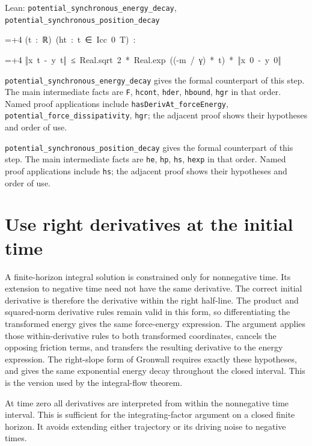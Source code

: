 \documentclass[11pt,a4paper]{article}
\newlength{\leancharwidth}
\newenvironment{leancode}{\par\smallskip\begingroup\ttfamily\footnotesize\raggedright
  \settowidth{\leancharwidth}{M}\setlength{\parskip}{0pt}\setlength{\parindent}{0pt}
  \frenchspacing}{\par\endgroup\smallskip}
\newcommand{\leanline}[2]{\hangindent=\dimexpr#1\leancharwidth+4\leancharwidth\relax
  \hangafter=1\noindent\hspace*{#1\leancharwidth}#2\par}
\newcommand{\leanlabel}[1]{\par\smallskip\noindent{\small\bfseries #1}\par}
\begin{document}
\begin{leanbox}{Lean: \texttt{potential\_\allowbreak{}synchronous\_\allowbreak{}energy\_\allowbreak{}decay}, \texttt{potential\_\allowbreak{}synchronous\_\allowbreak{}position\_\allowbreak{}decay}}
\begin{leancode}
\leanline{4}{(t\ :\ ℝ)\ (ht\ :\ t\ ∈\ Icc\ 0\ T)\ :}
\leanline{4}{‖x\ t\ -\ y\ t‖\ ≤\ Real.sqrt\ 2\ *\ Real.exp\ ((-m\ /\ γ)\ *\ t)\ *\ ‖x\ 0\ -\ y\ 0‖}
\end{leancode}
\leanlabel{How the Lean proof follows the argument}
\texttt{potential\_\allowbreak{}synchronous\_\allowbreak{}energy\_\allowbreak{}decay} gives the formal counterpart of this step. The main intermediate facts are \texttt{F}, \texttt{hcont}, \texttt{hder}, \texttt{hbound}, \texttt{hgr} in that order. Named proof applications include \texttt{has\allowbreak{}Deriv\allowbreak{}At\_\allowbreak{}force\allowbreak{}Energy}, \texttt{potential\_\allowbreak{}force\_\allowbreak{}dissipativity}, \texttt{hgr}; the adjacent proof shows their hypotheses and order of use.




\texttt{potential\_\allowbreak{}synchronous\_\allowbreak{}position\_\allowbreak{}decay} gives the formal counterpart of this step. The main intermediate facts are \texttt{he}, \texttt{hp}, \texttt{hs}, \texttt{hexp} in that order. Named proof applications include \texttt{hs}; the adjacent proof shows their hypotheses and order of use.
\end{leanbox}

\section{\texorpdfstring{Use right derivatives at the initial time}{Use right derivatives at the initial time}}


A finite-horizon integral solution is constrained only for nonnegative time. Its extension to negative time need not have the same derivative. The correct initial derivative is therefore the derivative within the right half-line. The product and squared-norm derivative rules remain valid in this form, so differentiating the transformed energy gives the same force-energy expression. The argument applies those within-derivative rules to both transformed coordinates, cancels the opposing friction terms, and transfers the resulting derivative to the energy expression. The right-slope form of Gronwall requires exactly these hypotheses, and gives the same exponential energy decay throughout the closed interval. This is the version used by the integral-flow theorem.



At time zero all derivatives are interpreted from within the nonnegative time interval. This is sufficient for the integrating-factor argument on a closed finite horizon. It avoids extending either trajectory or its driving noise to negative times.
\end{document}
